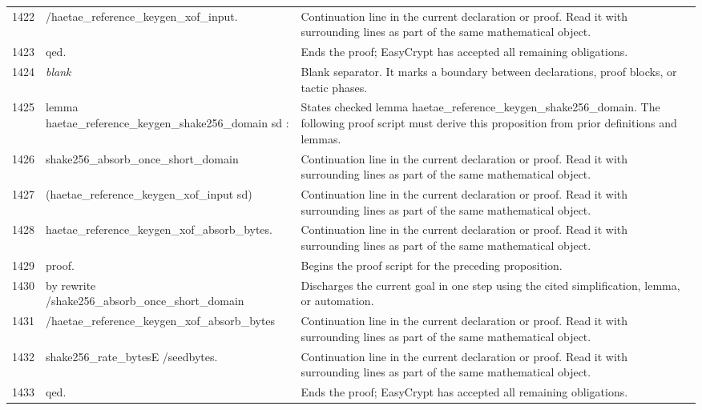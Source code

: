 \documentclass[10pt]{article}
\begin{document}
\begin{longtable}{r L{0.53\textwidth} L{0.37\textwidth}}
1422 & {\ttfamily\scriptsize            /haetae\_reference\_keygen\_xof\_input.} & Continuation line in the current declaration or proof.  Read it with surrounding lines as part of the same mathematical object. \\
1423 & {\ttfamily\scriptsize qed.} & Ends the proof; EasyCrypt has accepted all remaining obligations. \\
1424 & {\ttfamily\scriptsize \emph{blank}} & Blank separator.  It marks a boundary between declarations, proof blocks, or tactic phases. \\
1425 & {\ttfamily\scriptsize lemma haetae\_reference\_keygen\_shake256\_domain sd :} & States checked lemma haetae\_reference\_keygen\_shake256\_domain.  The following proof script must derive this proposition from prior definitions and lemmas. \\
1426 & {\ttfamily\scriptsize   shake256\_absorb\_once\_short\_domain} & Continuation line in the current declaration or proof.  Read it with surrounding lines as part of the same mathematical object. \\
1427 & {\ttfamily\scriptsize     (haetae\_reference\_keygen\_xof\_input sd)} & Continuation line in the current declaration or proof.  Read it with surrounding lines as part of the same mathematical object. \\
1428 & {\ttfamily\scriptsize     haetae\_reference\_keygen\_xof\_absorb\_bytes.} & Continuation line in the current declaration or proof.  Read it with surrounding lines as part of the same mathematical object. \\
1429 & {\ttfamily\scriptsize proof.} & Begins the proof script for the preceding proposition. \\
1430 & {\ttfamily\scriptsize by rewrite /shake256\_absorb\_once\_short\_domain} & Discharges the current goal in one step using the cited simplification, lemma, or automation. \\
1431 & {\ttfamily\scriptsize            /haetae\_reference\_keygen\_xof\_absorb\_bytes} & Continuation line in the current declaration or proof.  Read it with surrounding lines as part of the same mathematical object. \\
1432 & {\ttfamily\scriptsize            shake256\_rate\_bytesE /seedbytes.} & Continuation line in the current declaration or proof.  Read it with surrounding lines as part of the same mathematical object. \\
1433 & {\ttfamily\scriptsize qed.} & Ends the proof; EasyCrypt has accepted all remaining obligations. \\

\end{longtable}
\end{document}
